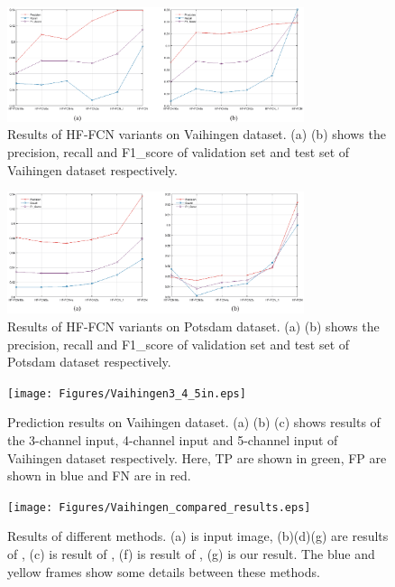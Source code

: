 \begin{figure}
\centering
\includegraphics[width=8.7cm]{Figures/vaihingen_variants.eps}
\caption{Results of HF-FCN variants on Vaihingen dataset. (a) (b) shows the precision, recall and F1\_score of validation set and test set of Vaihingen dataset respectively.}
\label{fig:Vaihingen-variants}
\end{figure}

\begin{figure}
\centering
\includegraphics[width=8.7cm]{Figures/Potsdam_variants.eps}
\caption{Results of HF-FCN variants on Potsdam dataset. (a) (b) shows the precision, recall and F1\_score of validation set and test set of Potsdam dataset respectively.}
\label{fig:Potsdam-variants}
\end{figure}

\begin{figure}
\centering
\texttt{[image: Figures/Vaihingen3\_4\_5in.eps]}
\caption{Prediction results on Vaihingen dataset. (a) (b) (c) shows results of the 3-channel input, 4-channel input and 5-channel input of Vaihingen dataset respectively. Here, TP are shown in green, FP are shown in blue and FN are in red.}
\label{fig:Vaihingen-3-4-5in}
\end{figure}

\begin{figure}
\centering
\texttt{[image: Figures/Vaihingen\_compared\_results.eps]}
\caption{Results of different methods. (a) is input image, (b)(d)(g) are results of \cite{IEEEexample:audebert2017deep}, (c) is result of \cite{IEEEexample:marmanis2016semantic}, (f) is result of \cite{IEEEexample:unknown}, (g) is our result. The blue and yellow frames show some details between these methods.}
\label{fig:Vaihingen-compared-others}
\end{figure}


